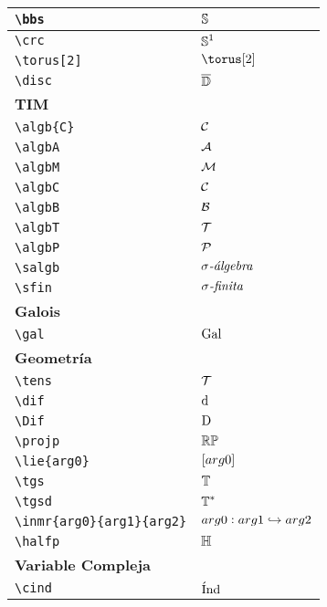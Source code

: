 \begin{longtable}{|p{3.5cm}|p{2cm}|}
\verb|\bbs| & $\displaystyle\mathbb{S}$ \\ \midrule 
\verb|\crc| & $\displaystyle\mathbb{S}^1$ \\ \midrule 
\verb|\torus[2]| & $\displaystyle\torus[2]$ \\ \midrule 
\verb|\disc| & $\displaystyle\overline{\mathbb{D}}$ \\ \midrule 
\bottomrule \multicolumn{2}{|p{5.5cm}|}{\textbf{TIM}} \\ \toprule 
\verb|\algb{C}| & $\displaystyle\mathcal{C}$ \\ \midrule 
\verb|\algbA| & $\displaystyle\mathcal{A}$ \\ \midrule 
\verb|\algbM| & $\displaystyle\mathcal{M}$ \\ \midrule 
\verb|\algbC| & $\displaystyle\mathcal{C}$ \\ \midrule 
\verb|\algbB| & $\displaystyle\mathcal{B}$ \\ \midrule 
\verb|\algbT| & $\displaystyle\mathcal{T}$ \\ \midrule 
\verb|\algbP| & $\displaystyle\mathcal{P}$ \\ \midrule 
\verb|\salgb| & $\displaystyle\sigma \textit{-\'{a}lgebra}$ \\ \midrule 
\verb|\sfin| & $\displaystyle\sigma \textit{-finita}$ \\ \midrule 
\bottomrule \multicolumn{2}{|p{5.5cm}|}{\textbf{Galois}} \\ \toprule 
\verb|\gal| & $\displaystyle\mathrm{Gal}\,$ \\ \midrule 
\bottomrule \multicolumn{2}{|p{5.5cm}|}{\textbf{Geometría}} \\ \toprule 
\verb|\tens| & $\displaystyle\mathcal{T}$ \\ \midrule 
\verb|\dif| & $\displaystyle\operatorname{d\!}{}$ \\ \midrule 
\verb|\Dif| & $\displaystyle\operatorname{D\!}{}$ \\ \midrule 
\verb|\projp| & $\displaystyle\mathbb{RP}$ \\ \midrule 
\verb|\lie{arg0}| & $\displaystyle\left[arg0\right]$ \\ \midrule 
\verb|\tgs| & $\displaystyle\mathbb{T}$ \\ \midrule 
\verb|\tgsd| & $\displaystyle\mathbb{T}^*$ \\ \midrule 
\verb|\inmr{arg0}{arg1}{arg2}| & $\displaystyle arg0 : arg1 \hookrightarrow arg2$ \\ \midrule 
\verb|\halfp| & $\displaystyle\mathbb{H}$ \\ \midrule 
\bottomrule \multicolumn{2}{|p{5.5cm}|}{\textbf{Variable Compleja}} \\ \toprule 
\verb|\cind| & $\displaystyle\operatorname{\acute{I}nd}$ \\ \midrule 

\end{longtable}
